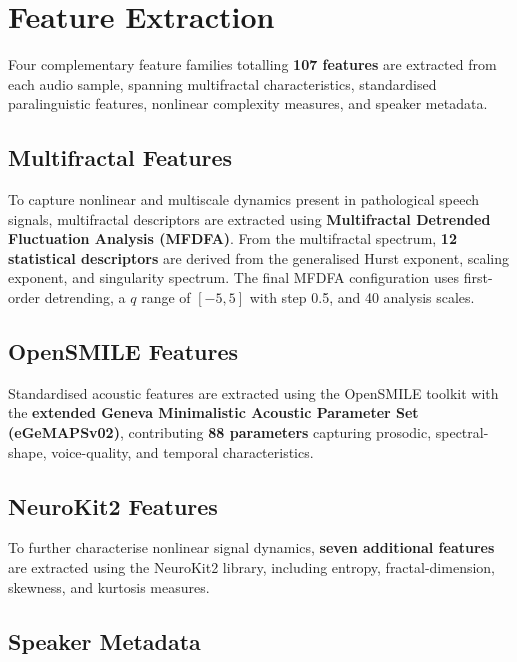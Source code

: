 \documentclass[conference]{IEEEtran}
\begin{document}
  \section{Feature Extraction}
  \label{sec:features}

  Four complementary feature families totalling \textbf{107 features} are extracted from each audio sample, spanning multifractal characteristics, standardised paralinguistic features, nonlinear complexity measures, and speaker metadata.

  \subsection{Multifractal Features}

  To capture nonlinear and multiscale dynamics present in pathological speech signals, multifractal descriptors are extracted using \textbf{Multifractal Detrended Fluctuation Analysis (MFDFA)}. From the multifractal spectrum, \textbf{12 statistical descriptors} are derived from the generalised Hurst exponent, scaling exponent, and singularity spectrum. The final MFDFA configuration uses first-order detrending, a $q$ range of $[-5,5]$ with step 0.5, and 40 analysis scales.

  \subsection{OpenSMILE Features}

  Standardised acoustic features are extracted using the OpenSMILE toolkit with the \textbf{extended Geneva Minimalistic Acoustic Parameter Set (eGeMAPSv02)}, contributing \textbf{88 parameters} capturing prosodic, spectral-shape, voice-quality, and temporal characteristics.

  \subsection{NeuroKit2 Features}

  To further characterise nonlinear signal dynamics, \textbf{seven additional features} are extracted using the NeuroKit2 library, including entropy, fractal-dimension, skewness, and kurtosis measures.

  \subsection{Speaker Metadata}
\end{document}

